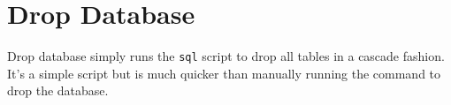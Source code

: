 \section{Drop Database}
Drop database simply runs the \texttt{sql} script to drop all tables in a cascade fashion. It's a simple script but is much quicker than manually running the command to drop the database.
